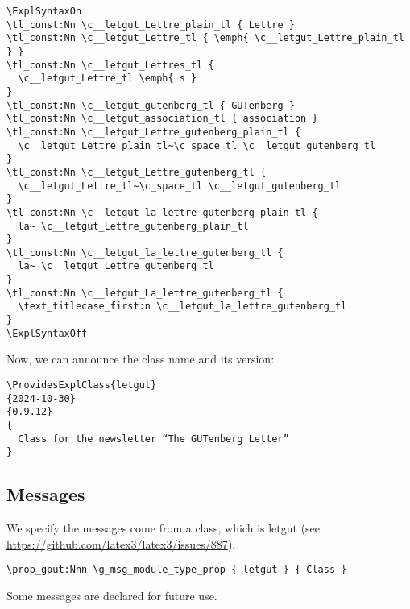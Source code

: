 \documentclass{letgut}
\begin{document}
\begin{lstlisting}
\ExplSyntaxOn
\tl_const:Nn \c__letgut_Lettre_plain_tl { Lettre }
\tl_const:Nn \c__letgut_Lettre_tl { \emph{ \c__letgut_Lettre_plain_tl } }
\tl_const:Nn \c__letgut_Lettres_tl {
  \c__letgut_Lettre_tl \emph{ s }
}
\tl_const:Nn \c__letgut_gutenberg_tl { GUTenberg }
\tl_const:Nn \c__letgut_association_tl { association }
\tl_const:Nn \c__letgut_Lettre_gutenberg_plain_tl {
  \c__letgut_Lettre_plain_tl~\c_space_tl \c__letgut_gutenberg_tl
}
\tl_const:Nn \c__letgut_Lettre_gutenberg_tl {
  \c__letgut_Lettre_tl~\c_space_tl \c__letgut_gutenberg_tl
}
\tl_const:Nn \c__letgut_la_lettre_gutenberg_plain_tl {
  la~ \c__letgut_Lettre_gutenberg_plain_tl
}
\tl_const:Nn \c__letgut_la_lettre_gutenberg_tl {
  la~ \c__letgut_Lettre_gutenberg_tl
}
\tl_const:Nn \c__letgut_La_lettre_gutenberg_tl {
  \text_titlecase_first:n \c__letgut_la_lettre_gutenberg_tl
}
\ExplSyntaxOff
\end{lstlisting}

Now, we can announce the class name and its version:

\begin{lstlisting}
\ProvidesExplClass{letgut}
{2024-10-30}
{0.9.12}
{
  Class for the newsletter “The GUTenberg Letter”
}
\end{lstlisting}

\subsection{Messages}
\label{ImplementationMessages-xg7g55h0jlj0}
We specify the messages come from a class, which is letgut (see
\url{https://github.com/latex3/latex3/issues/887}).

\begin{lstlisting}
\prop_gput:Nnn \g_msg_module_type_prop { letgut } { Class }
\end{lstlisting}

Some messages are declared for future use.
\end{document}
